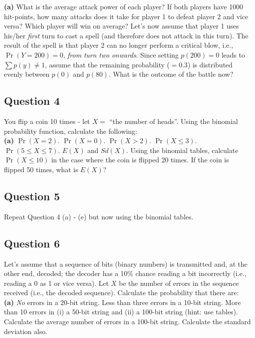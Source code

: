 {\bf(a)} What is the average attack power of each player?  If both players have 1000 hit-points, how many attacks does it take for player 1 to defeat player 2 and vice versa? Which player will win on average?  Let's now assume that player 1 uses his/her \emph{first} turn to cast a spell (and therefore does not attack in this turn). The result of the spell is that player 2 can no longer perform a critical blow, i.e., $\Pr(Y=200) = 0$, \emph{from turn two onwards}. Since setting $p(200) = 0$ leads to $\sum p(y) \ne 1$, assume that the remaining probability ($= 0.3$) is distributed evenly between $p(0)$ and $p(80)$. What is the outcome of the battle now?


\subsection*{Question 4}

You flip a coin 10 times - let $X =$ ``the number of heads''. Using the binomial probability function, calculate the following:\\[-0.2cm]

{\bf(a)} $\Pr(X = 2)$.  $\Pr(X = 0)$.   $\Pr(X > 2)$.  $\Pr(X \le 3)$.  $\Pr(5 \le X \le 7)$.   $E(X)$ and $Sd(X)$.  Using the binomial tables, calculate $\Pr(X \le10)$ in the case where the coin is flipped 20 times.  If the coin is flipped 50 times, what is $E(X)$?

\subsection*{Question 5}

Repeat Question 4 (a) - (e) but now using the binomial tables.



\subsection*{Question 6}

Let's assume that a sequence of bits (binary numbers) is transmitted and, at the other end, decoded; the decoder has a 10\% chance reading a bit incorrectly (i.e., reading a 0 as 1 or vice versa). Let $X$ be the number of errors in the sequence received (i.e., the decoded sequence). Calculate the probability that there are: \\[-0.2cm]

{\bf(a)} \emph{No} errors in a 20-bit string.  Less than three errors in a 10-bit string.  More than 10 errors in (i) a 50-bit string and (ii) a 100-bit string (hint: use tables).  Calculate the average number of errors in a 100-bit string. Calculate the standard deviation also.



